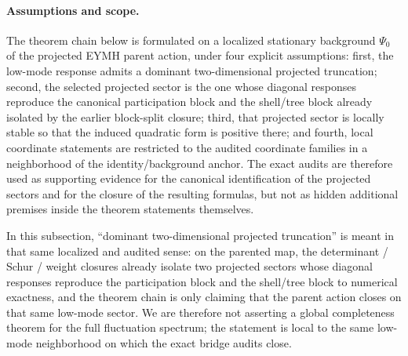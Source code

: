 \documentclass[aps,prd,onecolumn,notitlepage,nofootinbib,superscriptaddress,11pt,floatfix]{revtex4-2}
\begin{document}
\paragraph{Assumptions and scope.}
The theorem chain below is formulated on a localized stationary background \(\Psi_0\) of the projected EYMH parent action, under four explicit assumptions: first, the low-mode response admits a dominant two-dimensional projected truncation; second, the selected projected sector is the one whose diagonal responses reproduce the canonical participation block and the shell/tree block already isolated by the earlier block-split closure; third, that projected sector is locally stable so that the induced quadratic form is positive there; and fourth, local coordinate statements are restricted to the audited coordinate families in a neighborhood of the identity/background anchor. The exact audits are therefore used as supporting evidence for the canonical identification of the projected sectors and for the closure of the resulting formulas, but not as hidden additional premises inside the theorem statements themselves.

In this subsection, ``dominant two-dimensional projected truncation'' is meant in that same localized and audited sense: on the parented map, the determinant / Schur / weight closures already isolate two projected sectors whose diagonal responses reproduce the participation block and the shell/tree block to numerical exactness, and the theorem chain is only claiming that the parent action closes on that same low-mode sector. We are therefore not asserting a global completeness theorem for the full fluctuation spectrum; the statement is local to the same low-mode neighborhood on which the exact bridge audits close.
\end{document}

